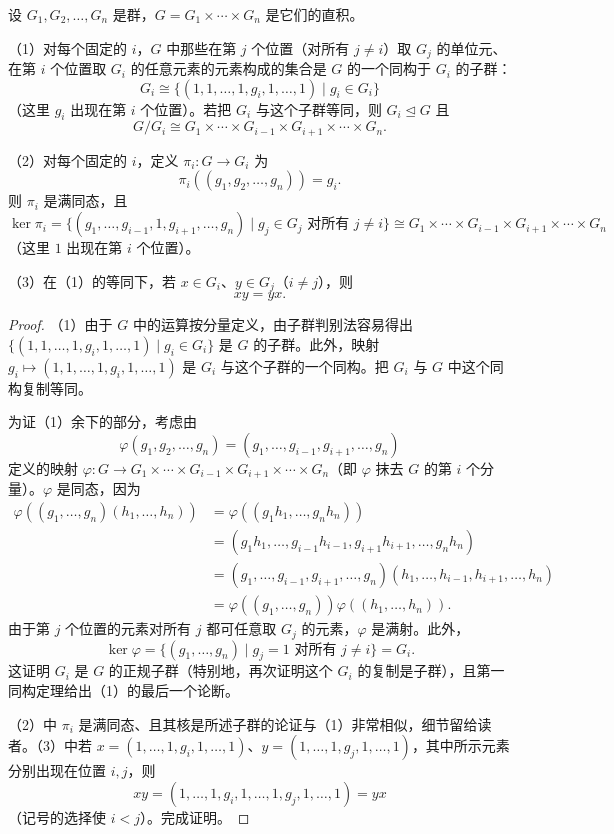\begin{proposition}\label{pro:5.2}
设 \(G_1, G_2, \ldots, G_n\) 是群，\(G = G_1 \times \cdots \times G_n\) 是它们的直积。

（1）对每个固定的 \(i\)，\(G\) 中那些在第 \(j\) 个位置（对所有 \(j \neq i\)）取 \(G_j\) 的单位元、在第 \(i\) 个位置取 \(G_i\) 的任意元素的元素构成的集合是 \(G\) 的一个同构于 \(G_i\) 的子群：
\[
G_i \cong \{(1, 1, \ldots, 1, g_i, 1, \ldots, 1) \mid g_i \in G_i\}
\]
（这里 \(g_i\) 出现在第 \(i\) 个位置）。若把 \(G_i\) 与这个子群等同，则 \(G_i \trianglelefteq G\) 且
\[
G/G_i \cong G_1 \times \cdots \times G_{i-1} \times G_{i+1} \times \cdots \times G_n.
\]

（2）对每个固定的 \(i\)，定义 \(\pi_i : G \to G_i\) 为
\[
\pi_i((g_1, g_2, \ldots, g_n)) = g_i.
\]
则 \(\pi_i\) 是满同态，且
\[
\ker \pi_i = \{(g_1, \ldots, g_{i-1}, 1, g_{i+1}, \ldots, g_n) \mid g_j \in G_j \text{ 对所有 } j \neq i\} \cong G_1 \times \cdots \times G_{i-1} \times G_{i+1} \times \cdots \times G_n
\]
（这里 \(1\) 出现在第 \(i\) 个位置）。

（3）在（1）的等同下，若 \(x \in G_i\)、\(y \in G_j\)（\(i \neq j\)），则
\[
xy = yx.
\]
\end{proposition}

\begin{proof}
（1）由于 \(G\) 中的运算按分量定义，由子群判别法容易得出 \(\{(1, 1, \ldots, 1, g_i, 1, \ldots, 1) \mid g_i \in G_i\}\) 是 \(G\) 的子群。此外，映射 \(g_i \mapsto (1, 1, \ldots, 1, g_i, 1, \ldots, 1)\) 是 \(G_i\) 与这个子群的一个同构。把 \(G_i\) 与 \(G\) 中这个同构复制等同。

为证（1）余下的部分，考虑由
\[
\varphi(g_1, g_2, \ldots, g_n) = (g_1, \ldots, g_{i-1}, g_{i+1}, \ldots, g_n)
\]
定义的映射 \(\varphi : G \to G_1 \times \cdots \times G_{i-1} \times G_{i+1} \times \cdots \times G_n\)（即 \(\varphi\) 抹去 \(G\) 的第 \(i\) 个分量）。\(\varphi\) 是同态，因为
\[
\begin{aligned}
\varphi((g_1, \ldots, g_n)(h_1, \ldots, h_n)) &= \varphi((g_1h_1, \ldots, g_nh_n)) \\
&= (g_1h_1, \ldots, g_{i-1}h_{i-1}, g_{i+1}h_{i+1}, \ldots, g_nh_n) \\
&= (g_1, \ldots, g_{i-1}, g_{i+1}, \ldots, g_n)(h_1, \ldots, h_{i-1}, h_{i+1}, \ldots, h_n) \\
&= \varphi((g_1, \ldots, g_n))\varphi((h_1, \ldots, h_n)).
\end{aligned}
\]
由于第 \(j\) 个位置的元素对所有 \(j\) 都可任意取 \(G_j\) 的元素，\(\varphi\) 是满射。此外，
\[
\ker \varphi = \{(g_1, \ldots, g_n) \mid g_j = 1 \text{ 对所有 } j \neq i\} = G_i.
\]
这证明 \(G_i\) 是 \(G\) 的正规子群（特别地，再次证明这个 \(G_i\) 的复制是子群），且第一同构定理给出（1）的最后一个论断。

（2）中 \(\pi_i\) 是满同态、且其核是所述子群的论证与（1）非常相似，细节留给读者。（3）中若 \(x = (1, \ldots, 1, g_i, 1, \ldots, 1)\)、\(y = (1, \ldots, 1, g_j, 1, \ldots, 1)\)，其中所示元素分别出现在位置 \(i, j\)，则
\[
xy = (1, \ldots, 1, g_i, 1, \ldots, 1, g_j, 1, \ldots, 1) = yx
\]
（记号的选择使 \(i < j\)）。完成证明。
\end{proof}

